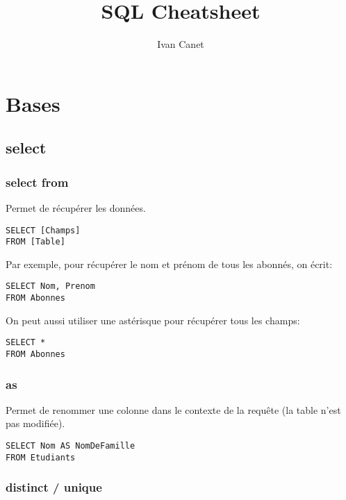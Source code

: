 \documentclass[10pt,a4paper,french]{article}
\begin{document}
\title{SQL Cheatsheet}
\author{Ivan Canet}
\maketitle


\tableofcontents

\section{Bases}

\subsection{\gls{select}}

\subsubsection{\gls{select} \gls{from}}

Permet de récupérer les données.
\begin{verbatim}
SELECT [Champs]
FROM [Table]
\end{verbatim}

Par exemple, pour récupérer le nom et prénom de tous les abonnés, on écrit:
\begin{verbatim}
SELECT Nom, Prenom
FROM Abonnes
\end{verbatim}

On peut aussi utiliser une astérisque pour récupérer tous les champs:
\begin{verbatim}
SELECT *
FROM Abonnes
\end{verbatim}

\subsubsection{\gls{as}}

Permet de renommer une colonne dans le contexte de la requête (la table n'est pas modifiée).
\begin{verbatim}
SELECT Nom AS NomDeFamille
FROM Etudiants
\end{verbatim}

\subsubsection{\gls{distinct} / \gls{unique}}
\end{document}
